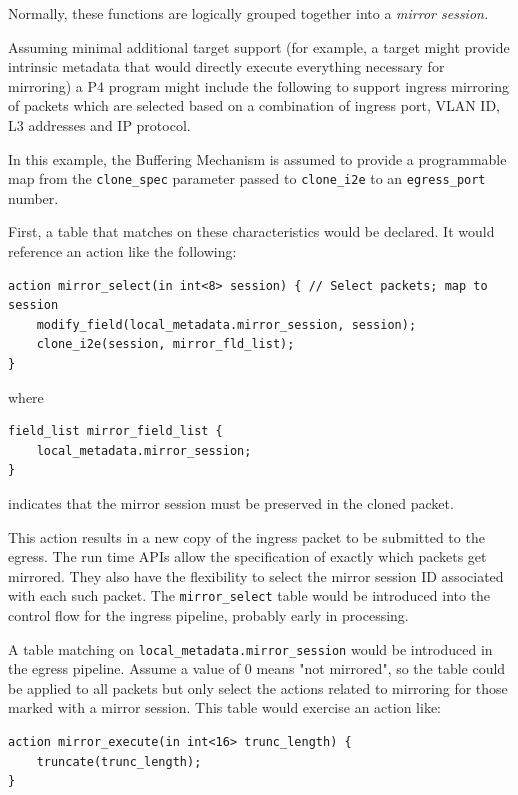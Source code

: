 \documentclass[12pt]{article}
\begin{document}
Normally, these functions are logically grouped together into a \textit{mirror session.}

Assuming minimal additional target support (for example, a target might provide 
intrinsic metadata that would directly execute everything necessary for mirroring) 
a P4 program might include the following to support ingress mirroring of packets 
which are selected based on a combination of ingress port, VLAN ID, L3 addresses 
and IP protocol.

In this example, the Buffering Mechanism is assumed to provide a programmable 
map from the \texttt{clone_spec} parameter passed to \texttt{clone_i2e} to an 
\texttt{egress_port} number.

First, a table that matches on these characteristics would be declared. It 
would reference an action like the following:

\begin{lstlisting}[style=P4style]
action mirror_select(in int<8> session) { // Select packets; map to session
    modify_field(local_metadata.mirror_session, session);
    clone_i2e(session, mirror_fld_list);
}
\end{lstlisting}

where

\begin{lstlisting}[style=P4style]
field_list mirror_field_list {
    local_metadata.mirror_session;
}
\end{lstlisting}

indicates that the mirror session must be preserved in the cloned packet.

This action results in a new copy of the ingress packet to be submitted to 
the egress. The run time APIs allow the specification of exactly which packets 
get mirrored. They also have the flexibility to select the mirror session 
ID associated with each such packet. The \texttt{mirror_select} table would be introduced 
into the control flow for the ingress pipeline, probably early in processing. 

A table matching on \texttt{local_metadata.mirror_session} would be introduced 
in the egress pipeline. Assume a value of 0 means "not mirrored", so the table 
could be applied to all packets but only select the actions related to mirroring 
for those marked with a mirror session. This table would exercise an action 
like:

\begin{lstlisting}[style=P4style]
action mirror_execute(in int<16> trunc_length) {
    truncate(trunc_length);
}
\end{lstlisting}
\end{document}
